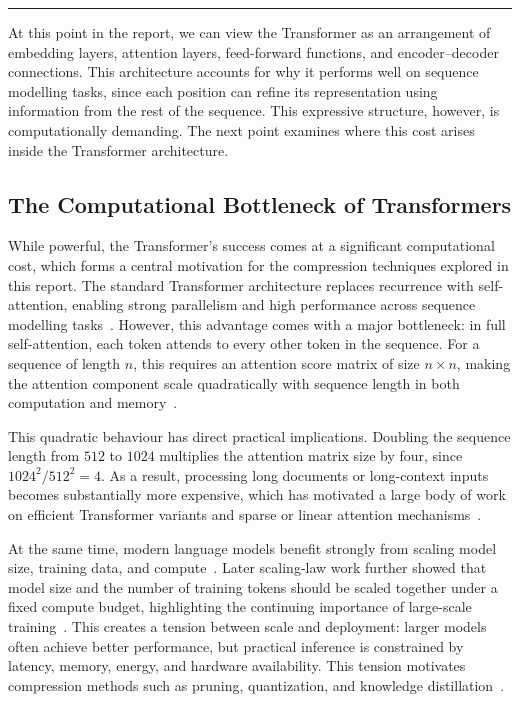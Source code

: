 \vspace{0.8em}
\noindent\rule{\textwidth}{0.4pt}
\vspace{0.8em}

At this point in the report, we can view the Transformer as an arrangement of embedding layers, attention layers, feed-forward functions, and encoder--decoder connections. This architecture accounts for why it performs well on sequence modelling tasks, since each position can refine its representation using information from the rest of the sequence. This expressive structure, however, is computationally demanding. The next point examines where this cost arises inside the Transformer architecture.

\subsection{The Computational Bottleneck of Transformers}
\label{sec:transformer_bottleneck}
While powerful, the Transformer's success comes at a significant computational cost, which forms a central motivation for the compression techniques explored in this report. The standard Transformer architecture replaces recurrence with self-attention, enabling strong parallelism and high performance across sequence modelling tasks~\cite{vaswani2017attention}. However, this advantage comes with a major bottleneck: in full self-attention, each token attends to every other token in the sequence. For a sequence of length $n$, this requires an attention score matrix of size $n \times n$, making the attention component scale quadratically with sequence length in both computation and memory~\cite{beltagy2020longformer,tay2020efficient}.

This quadratic behaviour has direct practical implications. Doubling the sequence length from $512$ to $1024$ multiplies the attention matrix size by four, since $1024^2 / 512^2 = 4$. As a result, processing long documents or long-context inputs becomes substantially more expensive, which has motivated a large body of work on efficient Transformer variants and sparse or linear attention mechanisms~\cite{beltagy2020longformer,tay2020efficient}.

At the same time, modern language models benefit strongly from scaling model size, training data, and compute~\cite{kaplan2020scaling}. Later scaling-law work further showed that model size and the number of training tokens should be scaled together under a fixed compute budget, highlighting the continuing importance of large-scale training~\cite{hoffmann2022training}. This creates a tension between scale and deployment: larger models often achieve better performance, but practical inference is constrained by latency, memory, energy, and hardware availability. This tension motivates compression methods such as pruning, quantization, and knowledge distillation~\cite{han2015deep,sanh2019distilbert}.

